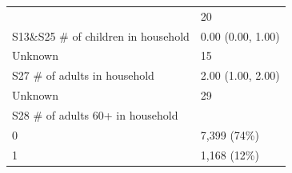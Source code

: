 \documentclass[]{article}
\begin{document}
\begin{longtable}[]{@{}ll@{}}
\begin{minipage}[t]{0.71\columnwidth}
\end{minipage} & \begin{minipage}[t]{0.23\columnwidth}\raggedright
20\strut
\end{minipage}\tabularnewline
\begin{minipage}[t]{0.71\columnwidth}\raggedright
S13\&S25 \# of children in household\strut
\end{minipage} & \begin{minipage}[t]{0.23\columnwidth}\raggedright
0.00 (0.00, 1.00)\strut
\end{minipage}\tabularnewline
\begin{minipage}[t]{0.71\columnwidth}\raggedright
Unknown\strut
\end{minipage} & \begin{minipage}[t]{0.23\columnwidth}\raggedright
15\strut
\end{minipage}\tabularnewline
\begin{minipage}[t]{0.71\columnwidth}\raggedright
S27 \# of adults in household\strut
\end{minipage} & \begin{minipage}[t]{0.23\columnwidth}\raggedright
2.00 (1.00, 2.00)\strut
\end{minipage}\tabularnewline
\begin{minipage}[t]{0.71\columnwidth}\raggedright
Unknown\strut
\end{minipage} & \begin{minipage}[t]{0.23\columnwidth}\raggedright
29\strut
\end{minipage}\tabularnewline
\begin{minipage}[t]{0.71\columnwidth}\raggedright
S28 \# of adults 60+ in household\strut
\end{minipage} & \begin{minipage}[t]{0.23\columnwidth}\raggedright
\strut
\end{minipage}\tabularnewline
\begin{minipage}[t]{0.71\columnwidth}\raggedright
0\strut
\end{minipage} & \begin{minipage}[t]{0.23\columnwidth}\raggedright
7,399 (74\%)\strut
\end{minipage}\tabularnewline
\begin{minipage}[t]{0.71\columnwidth}\raggedright
1\strut
\end{minipage} & \begin{minipage}[t]{0.23\columnwidth}\raggedright
1,168 (12\%)\strut
\end{minipage}\tabularnewline

\end{longtable}
\end{document}

